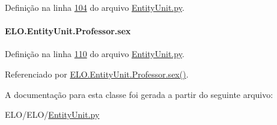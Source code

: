 Definição na linha \hyperlink{EntityUnit_8py_source_l00104}{104} do arquivo \hyperlink{EntityUnit_8py_source}{Entity\-Unit.\-py}.

\hypertarget{classELO_1_1EntityUnit_1_1Professor_ac049dc360c4af27037158e33577288e1}{
\paragraph[{sex}]{\setlength{\rightskip}{0pt plus 5cm}E\-L\-O.\-Entity\-Unit.\-Professor.\-sex}}\label{classELO_1_1EntityUnit_1_1Professor_ac049dc360c4af27037158e33577288e1}


Definição na linha \hyperlink{EntityUnit_8py_source_l00110}{110} do arquivo \hyperlink{EntityUnit_8py_source}{Entity\-Unit.\-py}.



Referenciado por \hyperlink{classELO_1_1EntityUnit_1_1Professor_a2244fa9a5f02a5845cc6c0686b2cf08a}{E\-L\-O.\-Entity\-Unit.\-Professor.\-sex()}.



A documentação para esta classe foi gerada a partir do seguinte arquivo\-:\begin{DoxyCompactItemize}
\item 
E\-L\-O/\-E\-L\-O/\hyperlink{EntityUnit_8py}{Entity\-Unit.\-py}\end{DoxyCompactItemize}
